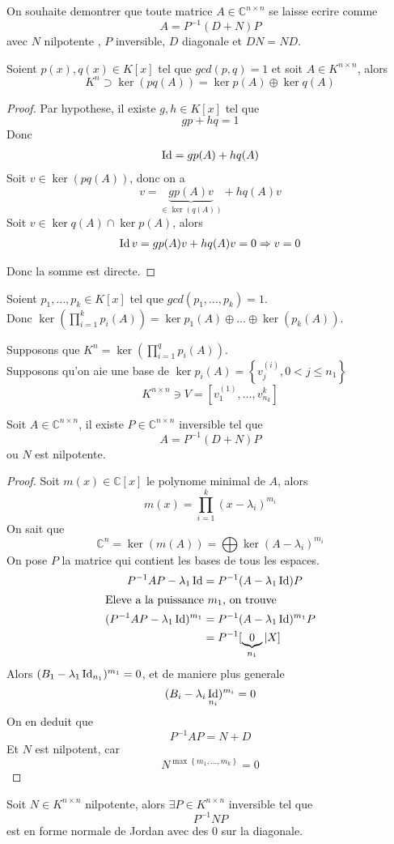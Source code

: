 \documentclass[../main.tex]{subfiles}
\begin{document}
On souhaite demontrer que toute matrice $A \in \mathbb{C}^{n\times n}$ se laisse ecrire comme
\[ 
	A = P^{-1}( D+N) P
\]
avec $N$ nilpotente , $P$ inversible, $D$ diagonale et $DN=ND$.
\begin{lemma}
	Soient $p( x) ,q( x)\in K[x] $ tel que $gcd( p,q) =1$ et soit $A \in K^{n\times n}$, alors
	\[ 
		K^{n}\supset \ker ( pq ( A) ) = \ker p( A) \oplus \ker q( A) 
	\]
	
\end{lemma}
\begin{proof}
	Par hypothese, il existe $g,h \in K[x]$ tel que
	\[ 
	gp + hq = 1
	\]
	Donc
	\begin{align}
	\operatorname*{Id}= gp( A) + hq( A) 
	\end{align}
	Soit $v \in \ker ( pq( A)  )$, donc on a 
	\[ 
		v= \underbrace{gp( A) v}_{\in \ker ( q( A) ) } + hq ( A) v
	\]
	Soit $v \in \ker q( A) \cap \ker p( A) $, alors
	\begin{align*}
		\operatorname*{Id} v = gp( A) v + hq( A) v = 0 \Rightarrow v=0
	\end{align*}
	
	Donc la somme est directe.
\end{proof}
\begin{crly}
	Soient $p_1, \ldots, p_k \in K[x]$ tel que $gcd( p_1, \ldots, p_k) =1$.\\
	Donc $\ker \left(\prod_{i=1} ^{k}p_i( A)  \right) =\ker p_1( A) \oplus \ldots \oplus \ker ( p_k( A) ) $.
\end{crly}
Supposons que $K^{n}= \ker \left( \prod_{i=1} ^{q} p_i( A)  \right) $.\\
Supposons qu'on aie une base de $\ker p_i( A) = \left\{ v_j^{( i) }, 0 < j \leq n_1 \right\} $ 
\[ 
	K^{n\times n} \ni V = \left[ v_1^{( 1) },\ldots, v_{n_k} ^{k} \right] 
\]
\begin{thm}
Soit $A \in \mathbb{C}^{n\times n}$, il existe $P \in \mathbb{C}^{n\times n}$ inversible tel que
\[ 
	A= P^{-1}( D+N) P
\]
ou $N$ est nilpotente.
\end{thm}
\begin{proof}
	Soit $m( x) \in \mathbb{C}[x]$ le polynome minimal de $A$, alors
	\[ 
		m( x) = \prod_{i=1} ^{k}( x-\lambda_i) ^{m_i}
	\]
	On sait que
	\[ 
		\mathbb{C}^{n}= \ker ( m( A) ) = \bigoplus \ker ( A- \lambda_i)^{m_i}
	\]
	On pose $P$ la matrice qui contient les bases de tous les espaces.
	\begin{align*}
		P^{-1}A P -\lambda_1 \operatorname*{Id} &= P^{-1}( A-\lambda_1 \operatorname*{Id}) P\\
		\intertext{Eleve a la puissance $m_1$, on trouve}
		( P^{-1}AP- \lambda_1 \operatorname*{Id}) ^{m_1} &= P^{-1}( A-\lambda_1 \operatorname*{Id}) ^{m_1}P\\
						  &= P^{-1 }[ \underbrace{0}_{n_1} |X ]
	\end{align*}
	Alors $( B_1 - \lambda_1 \operatorname*{Id}_{n_1} ) ^{m_1}=0$, et de maniere plus generale
	\[ 
( B_i - \lambda_i \operatorname*{Id}_{n_i} ) ^{m_i}=0
	\]
	On en deduit que
	\[ 
	P^{-1}A P = N +D
	\]
	Et $N$ est nilpotent, car
	\[ 
N^{\max \left\{ m_1,\ldots,m_k \right\} }	=0
	\]
		
		
\end{proof}
\begin{thm}
	Soit $N\in K^{n\times n}$ nilpotente, alors $\exists P \in K^{n\times n}$ inversible tel que
	\[ 
	P^{-1}NP
	\]
	est en forme normale de Jordan avec des 0 sur la diagonale.
	
\end{thm}
\end{document}
